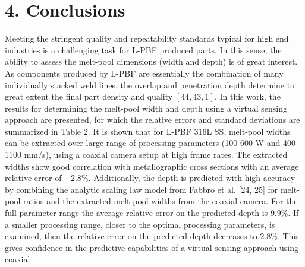\documentclass[10pt]{article}
\begin{document}
\section*{4. Conclusions}
Meeting the stringent quality and repeatability standards typical for high end industries is a challenging task for L-PBF produced parts. In this sense, the ability to assess the melt-pool dimensions (width and depth) is of great interest. As components produced by L-PBF are essentially the combination of many individually stacked weld lines, the overlap and penetration depth determine to great extent the final part density and quality $[44,43,1]$. In this work, the results for determining the melt-pool width and depth using a virtual sensing approach are presented, for which the relative errors and standard deviations are summarized in Table 2. It is shown that for L-PBF 316L SS, melt-pool widths can be extracted over large range of processing parameters (100-600 W and 400-1100 mm/s), using a coaxial camera setup at high frame rates. The extracted widths show good correlation with metallographic cross sections with an average relative error of $-2.8 \%$. Additionally, the depth is predicted with high accuracy by combining the analytic scaling law model from Fabbro et al. [24, 25] for melt-pool ratios and the extracted melt-pool widths from the coaxial camera. For the full parameter range the average relative error on the predicted depth is $9.9 \%$. If a smaller processing range, closer to the optimal processing parameters, is examined, then the relative error on the predicted depth decreases to $2.8 \%$. This gives confidence in the predictive capabilities of a virtual sensing approach using coaxial
\end{document}
